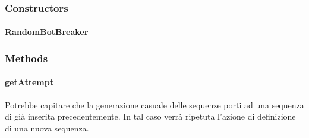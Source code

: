 \documentclass[letterpaper,10pt,italian,openany,oneside]{sphinxmanual}
\begin{document}
\subsubsection{Constructors}
\label{\detokenize{test/it/unicam/cs/pa/mastermind/players/RandomBotBreaker:constructors}}

\paragraph{RandomBotBreaker}
\label{\detokenize{test/it/unicam/cs/pa/mastermind/players/RandomBotBreaker:id1}}

\begin{fulllineitems}
\label{\detokenize{test/it/unicam/cs/pa/mastermind/players/RandomBotBreaker:it.unicam.cs.pa.mastermind.players.RandomBotBreaker.RandomBotBreaker(int)}}
\end{fulllineitems}



\subsubsection{Methods}
\label{\detokenize{test/it/unicam/cs/pa/mastermind/players/RandomBotBreaker:methods}}

\paragraph{getAttempt}
\label{\detokenize{test/it/unicam/cs/pa/mastermind/players/RandomBotBreaker:getattempt}}

\begin{fulllineitems}
\label{\detokenize{test/it/unicam/cs/pa/mastermind/players/RandomBotBreaker:it.unicam.cs.pa.mastermind.players.RandomBotBreaker.getAttempt()}}
Potrebbe capitare che la generazione casuale delle sequenze porti ad una sequenza di  già inserita precedentemente. In tal caso verrà ripetuta l’azione di definizione di una nuova sequenza.

\end{fulllineitems}
\end{document}
